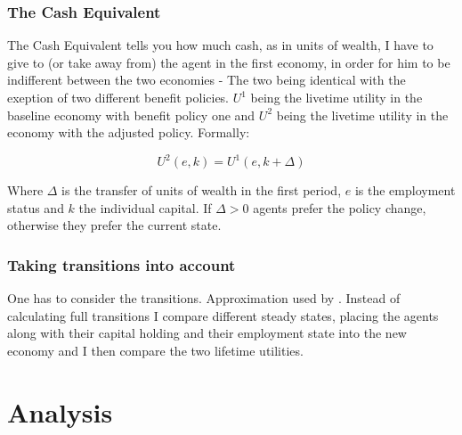 \documentclass[a4paper,12pt]{article}
\begin{document}
\subsubsection*{The Cash Equivalent}

The Cash Equivalent tells you how much cash, as in units of wealth, I have to give to (or take away from) the agent in the first economy, in order for him to be indifferent between the two economies - The two being identical with the exeption of two different benefit policies. $U^{1}$ being the livetime utility in the baseline economy with benefit policy one and $U^{2}$ being the livetime utility in the economy with the adjusted policy. Formally: 

  \begin{equation}
  U^{2}(e,k) = U^{1}(e,k+\Delta) \nonumber
  \end{equation}

Where $\Delta$ is the transfer of units of wealth in the first period, $e$ is the employment status and $k$ the individual capital. If $ \Delta>0 $ agents prefer the policy change, otherwise they prefer the current state. 

\subsubsection*{Taking transitions into account}

One has to consider the transitions. Approximation used by \cite{KrusellMukoyamaSahin}. Instead of calculating full transitions I compare different steady states, placing the agents along with their capital holding and their employment state into the new economy and I then compare the two lifetime utilities. 




\section{Analysis}
\end{document}
